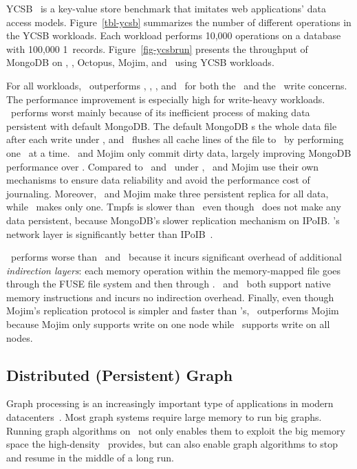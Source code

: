 YCSB~\cite{Cooper10-CloudCom} is a key-value store benchmark 
that imitates web applications' data access models. 
Figure~\ref{tbl-ycsb} summarizes the number of different operations in the YCSB workloads.
Each workload performs 10,000 operations on a database with 100,000 1\KB\ records.
Figure~\ref{fig-ycsbrun} presents the throughput of MongoDB on \tmpfs, \pmfs, Octopus, Mojim, and \hotpot\ using YCSB workloads. 

For all workloads, \hotpot\ outperforms \tmpfs, \pmfs, \Octopus, and \Mojim\ for both the \journaled\ and the \fsyncsafe\ write concerns. 
The performance improvement is especially high for write-heavy workloads.
\pmfs\ performs worst mainly because of its inefficient process of making data persistent with default MongoDB.
The default MongoDB \fsync{}s the whole data file after each write under \fsyncsafe,
and \pmfs\ flushes all cache lines of the file to \nvm\ by performing one \clflush\ at a time.
\hotpot\ and Mojim only commit dirty data, largely improving MongoDB performance over \pmfs.
Compared to \tmpfs\ and \pmfs\ under \journaled, \hotpot\ and Mojim use their own mechanisms to 
ensure data reliability and avoid the performance cost of journaling.
Moreover, \hotpot\ and Mojim make three persistent replica for all data, while \pmfs\ makes only one.
Tmpfs is slower than \hotpot\ even though \tmpfs\ does not make any data persistent, 
because MongoDB's slower replication mechanism on IPoIB.
\hotpot's network layer is significantly better than IPoIB~\cite{Tsai17-SOSP}.

\Octopus\ performs worse than \hotpot\ and \Mojim\ because it incurs significant overhead of additional {\em indirection layers}:
each memory operation within the memory-mapped file goes through the FUSE file system and then through \Octopus.
\hotpot\ and \Mojim\ both support native memory instructions and incurs no indirection overhead.
Finally, even though Mojim's replication protocol is simpler and faster than \hotpot's,
\hotpot\ outperforms Mojim because Mojim only supports write on one node while \hotpot\ supports write on all nodes.



\subsection{Distributed (Persistent) Graph}
Graph processing is an increasingly important type of applications in modern 
datacenters~\cite{Gonzalez12-OSDI,Gonzalez14-OSDI,Kyrola12-OSDI,Low10-UAI,Low12-VLDB,Malewicz10-SIGMOD}.
Most graph systems require large memory to run big graphs.
Running graph algorithms on \nvm\ not only enables them to exploit the big memory space the high-density \nvm\ provides,
but can also enable graph algorithms to stop and resume in the middle of a long run.


